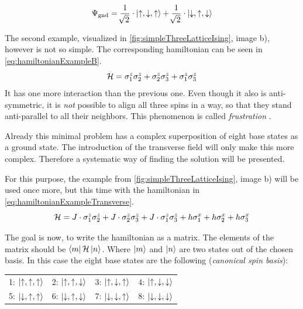 \begin{equation}
    \label{eq:solutionSimpleExample}
    \Psi_\mathrm{gnd} = \frac{1}{\sqrt[]{2}} \cdot \ket{\uparrow, \downarrow, \uparrow} +  \frac{1}{\sqrt[]{2}} \cdot \ket{\downarrow, \uparrow, \downarrow}
\end{equation}

The second example, visualized in \autoref{fig:simpleThreeLatticeIsing}, image b), however is not so simple. The corresponding hamiltonian can be seen in \autoref{eq:hamiltonianExampleB}.
\begin{equation}
    \label{eq:hamiltonianExampleB}
    \mathcal{H} = \sigma^z_1\sigma^z_2 +\sigma^z_2\sigma^z_3 +\sigma^z_1\sigma^z_3
\end{equation}
It has one more interaction than the previous one. Even though it also is anti-symmetric, it is \emph{not} possible to align all three spins in a way, so that they stand anti-parallel to all their neighbors. This phenomenon is called \emph{frustration} \cite*{frustration}.

Already this minimal problem has a complex superposition of eight base states as a ground state. The introduction of the transverse field will only make this more complex. Therefore a systematic way of finding the solution will be presented.

For this purpose, the example from \autoref{fig:simpleThreeLatticeIsing}, image b) will be used once more, but this time with the hamiltonian in \autoref{eq:hamiltonianExampleTransverse}.
\begin{equation}
    \label{eq:hamiltonianExampleTransverse}
    \mathcal{H} = J\cdot \sigma^z_1\sigma^z_2 +J\cdot\sigma^z_2\sigma^z_3 +J\cdot\sigma^z_1\sigma^z_3
    +h \sigma^x_1+h \sigma^x_2+h \sigma^x_3
\end{equation}

The goal is now, to write the hamiltonian \hamiltonian as a matrix. 
The elements of the matrix should be $\bra{m}\mathcal{H}\ket{n}$. Where $\ket{m}$ and $\ket{n}$ are two states out of the chosen basis. In this case the eight base states are the following (\emph{canonical spin basis}):

\begin{center}
    \begin{tabular}{llll} 
        1: $\ket{\uparrow, \uparrow, \uparrow}$ & 2: $\ket{\uparrow, \uparrow, \downarrow}$  & 3: $\ket{\uparrow, \downarrow, \uparrow}$  & 4: $\ket{\uparrow, \downarrow, \downarrow}$ \\
        5: $\ket{\downarrow, \uparrow, \uparrow}$ & 6: $\ket{\downarrow, \uparrow, \downarrow}$  & 7: $\ket{\downarrow, \downarrow, \uparrow}$  & 8: $\ket{\downarrow, \downarrow, \downarrow}$ 
    \end{tabular}
\end{center}

